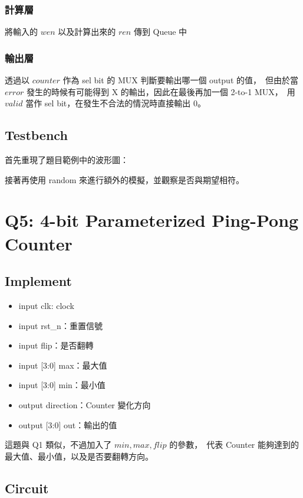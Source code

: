 \documentclass[10.5pt,compsoc,UTF8]{CjC}
\theoremstyle{mystyle}
\begin{document}
\subsubsection*{計算層}
將輸入的 $wen$ 以及計算出來的 $ren$ 傳到 Queue 中

\subsubsection*{輸出層}
透過以 $counter$ 作為 sel bit 的 MUX 判斷要輸出哪一個 output 的值，\
但由於當 $error$ 發生的時候有可能得到 X 的輸出，因此在最後再加一個 2-to-1 MUX，\
用 $valid$ 當作 sel bit，在發生不合法的情況時直接輸出 $0$。

\subsection{Testbench}

首先重現了題目範例中的波形圖：


接著再使用 random 來進行額外的模擬，並觀察是否與期望相符。

\section{Q5: 4-bit Parameterized Ping-Pong Counter}

\subsection{Implement}

\begin{itemize}
  \item input clk: clock
  \item input rst\_n：重置信號
  \item input flip：是否翻轉
  \item input [3:0] max：最大值
  \item input [3:0] min：最小值
  \item output direction：Counter 變化方向
  \item output [3:0] out：輸出的值
\end{itemize}

這題與 Q1 類似，不過加入了 $min, max, flip$ 的參數，\
代表 Counter 能夠達到的最大值、最小值，以及是否要翻轉方向。

\subsection{Circuit}
\end{document}
